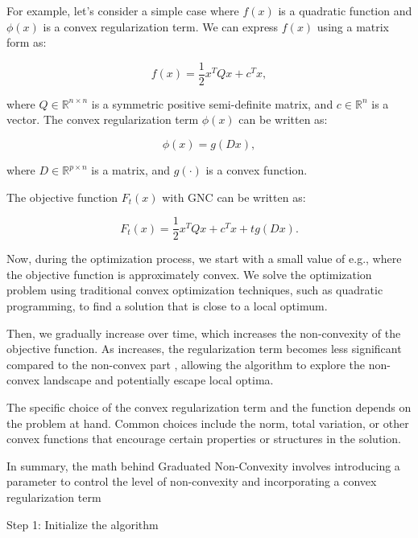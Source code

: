 For example, let's consider a simple case where $f(x)$ is a quadratic function and $\phi(x)$ is a convex regularization term. We can express $f(x)$ using a matrix form as:

\begin{equation}
	f(x) = \frac{1}{2} x^T Q x + c^T x,
\end{equation}

where $Q \in \mathbb{R}^{n \times n}$ is a symmetric positive semi-definite matrix, and $c \in \mathbb{R}^n$ is a vector.
The convex regularization term $\phi(x)$ can be written as:

\begin{equation}
	\phi(x) = g(Dx),
\end{equation}

where $D \in \mathbb{R}^{p \times n}$ is a matrix, and $g(\cdot)$ is a convex function.

The objective function $F_t(x)$ with GNC can be written as:

\begin{equation}
	F_t(x) = \frac{1}{2} x^T Q x + c^T x + t g(Dx).
\end{equation}

Now, during the optimization process, we start with a small value of  e.g.,  where the objective function is approximately convex. We solve the optimization problem using traditional convex optimization techniques, such as quadratic programming, to find a solution  that is close to a local optimum.

Then, we gradually increase  over time, which increases the non-convexity of the objective function. As  increases, the regularization term becomes less significant compared to the non-convex part , allowing the algorithm to explore the non-convex landscape and potentially escape local optima.

The specific choice of the convex regularization term  and the function  depends on the problem at hand. Common choices include the  norm, total variation, or other convex functions that encourage certain properties or structures in the solution.

In summary, the math behind Graduated Non-Convexity involves introducing a parameter  to control the level of non-convexity and incorporating a convex regularization term 


Step 1: Initialize the algorithm

